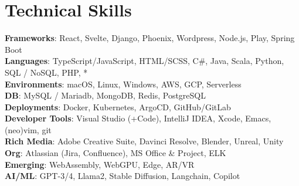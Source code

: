 \documentclass[letterpaper,11pt]{article}
\begin{document}
\section{Technical Skills}
\begin{itemize}[leftmargin=0.15in, label={}]
  \small{\item{
                \textbf{Frameworks}{: React, Svelte, Django, Phoenix, Wordpress, Node.js, Play, Spring Boot } \\
                \textbf{Languages}{: TypeScript/JavaScript, HTML/SCSS, C\#, Java, Scala, Python, SQL / NoSQL, PHP, * } \\
                \textbf{Environments}{: macOS, Linux, Windows, AWS, GCP, Serverless} \\
                \textbf{DB}{: MySQL / Mariadb, MongoDB, Redis, PostgreSQL } \\
                \textbf{Deployments}{: Docker, Kubernetes, ArgoCD, GitHub/GitLab } \\
                \textbf{Developer Tools}{: Visual Studio (+Code), IntelliJ IDEA, Xcode, Emacs, (neo)vim, git } \\
                \textbf{Rich Media}{: Adobe Creative Suite, Davinci Resolve, Blender, Unreal, Unity } \\
                \textbf{Org}{: Atlassian (Jira, Confluence), MS Office \& Project, ELK } \\
                \textbf{Emerging}{: WebAssembly, WebGPU, Edge, AR/VR } \\
                \textbf{AI/ML}{: GPT-3/4, Llama2, Stable Diffusion, Langchain, Copilot} \\
          }}
\end{itemize}


\end{document}
